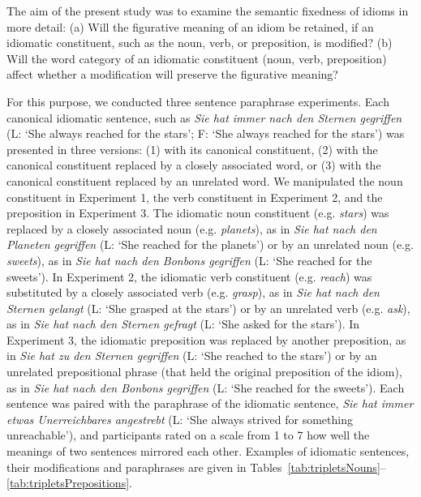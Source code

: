 \documentclass[output=paper]{langsci/langscibook}
\begin{document}
The aim of the present study was to examine the semantic fixedness of idioms in more detail: (a) Will the figurative meaning of an idiom be retained, if an idiomatic constituent, such as the noun, verb, or preposition, is modified?  (b) Will the word category of an idiomatic constituent (noun, verb, preposition) affect whether a modification will preserve the figurative meaning?

For this purpose, we conducted three sentence paraphrase experiments. Each canonical idiomatic sentence, such as \textit{Sie hat immer nach den Sternen gegriffen} (L: ‘She always reached for the stars’; F: `She always reached for the stars’) was presented in three versions: (1) with its canonical constituent, (2) with the canonical constituent replaced by a closely associated word, or (3) with the canonical constituent replaced by an unrelated word. We manipulated the noun constituent in Experiment 1, the verb constituent in Experiment 2, and the preposition in Experiment 3. The idiomatic noun constituent (e.g. \textit{stars}) was replaced by a closely associated noun (e.g. \textit{planets}), as in \textit{Sie hat nach den Planeten gegriffen} (L: ‘She reached for the planets’) or by an unrelated noun (e.g. \textit{sweets}), as in \textit{Sie hat nach den Bonbons gegriffen} (L: ‘She reached for the sweets’). In Experiment 2, the idiomatic verb constituent (e.g. \textit{reach}) was substituted by a closely associated verb (e.g. \textit{grasp}), as in \textit{Sie hat nach den Sternen gelangt} (L: ‘She grasped at the stars’) or by an unrelated verb (e.g. \textit{ask}), as in \textit{Sie hat nach den Sternen gefragt} (L: ‘She asked for the stars’). In Experiment 3, the idiomatic preposition was replaced by another preposition, as in \textit{Sie hat zu den Sternen gegriffen} (L: ‘She reached to the stars’) or by an unrelated prepositional phrase (that held the original preposition of the idiom), as in \textit{Sie hat nach den Bonbons gegriffen} (L: ‘She reached for the sweets’).  Each sentence was paired with the paraphrase of the idiomatic sentence, \textit{Sie hat immer etwas Unerreichbares angestrebt} (L: ‘She always strived for something unreachable’), and participants rated on a scale from 1 to 7 how well the meanings of two sentences mirrored each other. Examples of idiomatic sentences, their modifications and paraphrases are given in Tables~\ref{tab:tripletsNouns}--\ref{tab:tripletsPrepositions}.
\end{document}
